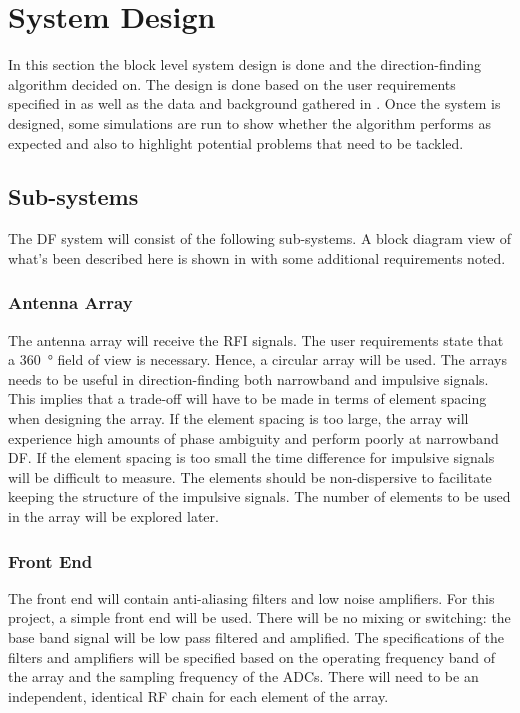 \chapter{System Design}
\label{ch:system-design}
\graphicspath{{./img/system-design/}}

In this section the block level system design is done and the direction-finding algorithm decided on.
The design is done based on the user requirements specified in  as well as the data and background gathered in .
Once the system is designed, some simulations are run to show whether the algorithm performs as expected and also to highlight potential problems that need to be tackled.

\section{Sub-systems}
The DF system will consist of the following sub-systems.
A block diagram view of what's been described here is shown in  with some additional requirements noted.

\subsection{Antenna Array}
The antenna array will receive the RFI signals. The user requirements state that a \SI{360}{\degree} field of view is necessary. Hence, a circular array will be used. The arrays needs to be useful in direction-finding both narrowband and impulsive signals. This implies that a trade-off will have to be made in terms of element spacing when designing the array. If the element spacing is too large, the array will experience high amounts of phase ambiguity and perform poorly at narrowband DF. If the element spacing is too small the time difference for impulsive signals will be difficult to measure. The elements should be non-dispersive to facilitate keeping the structure of the impulsive signals. The number of elements to be used in the array will be explored later.

\subsection{Front End}
The front end will contain anti-aliasing filters and low noise amplifiers. For this project, a simple front end will be used. There will be no mixing or switching: the base band signal will be low pass filtered and amplified. The specifications of the filters and amplifiers will be specified based on the operating frequency band of the array and the sampling frequency of the ADCs. There will need to be an independent, identical RF chain for each element of the array.

